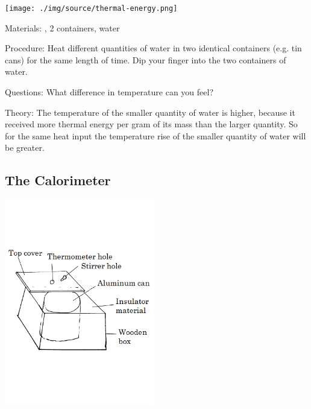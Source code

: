 \begin{multicols}{2}
\begin{center}
\texttt{[image: ./img/source/thermal-energy.png]}
\end{center}

\begin{description*}
\item[Materials:]{, 2 containers, water}
\item[Procedure:]{Heat different quantities of water in two identical containers (e.g. tin cans) for the same length of time. Dip your finger into the two containers of water.}
\item[Questions:]{What difference in temperature can you feel?}
\item[Theory:]{The temperature of the smaller quantity of water is higher, because it received more thermal energy per gram of its mass than the larger quantity. So for the same heat input the temperature rise of the smaller quantity of water will be greater.}
\end{description*}

\subsection{The Calorimeter}

\begin{center}
\includegraphics[width=0.49\textwidth]{./img/calorimeter.png}
\end{center}


\end{multicols}

